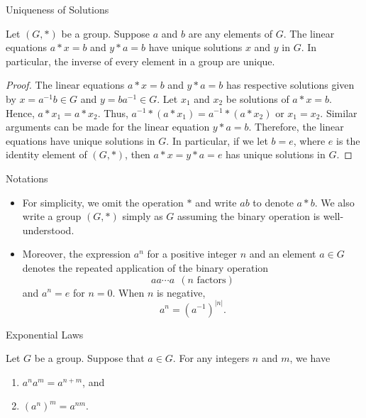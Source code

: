 \documentclass{beamer}
\begin{document}
\begin{frame}{Uniqueness of Solutions}
\begin{theorem}
\justifying
Let $(G, *)$ be a group. Suppose $a$ and $b$ are any elements of $G$. The linear equations $a * x = b$ and $y * a = b$ have unique solutions $x$ and $y$ in $G$. In particular, the inverse of every element in a group are unique.  
\end{theorem}
\pause
\begin{proof}
\justifying
The linear equations $a * x = b$ and $y * a = b$ has respective solutions given by $x = a^{-1}b \in G$ and $y = ba^{-1} \in G$. Let $x_1$ and $x_2$ be solutions of $a * x = b$. Hence, $a * x_1 = a * x_2$. Thus, $a^{-1} * (a * x_1) = a^{-1} * (a * x_2)$ or $x_1 = x_2$. Similar arguments can be made for the linear equation $y * a = b$. Therefore, the linear equations have unique solutions in $G$. In particular, if we let $b = e$, where $e$ is the identity element of $(G, *)$, then $a * x = y * a = e$ has unique solutions in $G$.
\end{proof}
\end{frame}

\begin{frame}{Notations}
\justifying
\begin{itemize}
\justifying
\item For simplicity, we omit the operation $*$ and write $ab$ to denote $a * b$. We also write a group $(G, *)$ simply as $G$ assuming the binary operation is well-understood.
\item Moreover, the expression $a^n$ for a positive integer $n$ and an element $a \in G$ denotes the repeated application of the binary operation
\[
aa\cdots a \ \ (n \text{ factors})
\]
and $a^n = e$ for $n = 0$. When $n$ is negative, 
\[
a^n = \left(a^{-1}\right)^{|n|}.
\]
\end{itemize}
\end{frame}

\begin{frame}{Exponential Laws}
\begin{theorem}
Let $G$ be a group. Suppose that $a \in G$. For any integers $n$ and $m$, we have
\begin{enumerate}
\item $a^{n}a^m = a^{n + m}$, and
\item $\left(a^n\right)^m = a^{nm}$.
\end{enumerate}
\end{theorem}
\end{frame}
\end{document}
